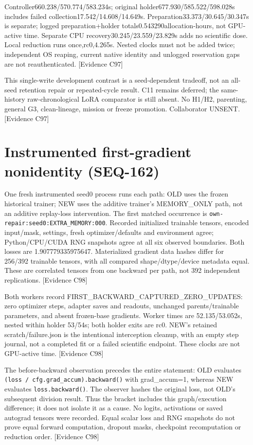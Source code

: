 \documentclass[11pt]{article}
\newcommand{\ev}[1]{\textsf{[Evidence #1]}}
\begin{document}
Controller660.238/570.774/583.234s; original holder677.930/585.522/598.028s includes
failed collection17.542/14.608/14.649s. Preparation33.373/30.645/30.347s is separate;
logged preparation+holder totals0.543290allocation-hours, not GPU-active time.
Separate CPU recovery30.245/23.559/23.829s adds no scientific dose. Local reduction
runs once,rc0,4.265s. Nested clocks must not be added twice; independent OS reaping,
current native identity and unlogged reservation gaps are not reauthenticated. \ev{C97}

This single-write development contrast is a seed-dependent tradeoff, not an
all-seed retention repair or repeated-cycle result. C11 remains deferred; the
same-history raw-chronological LoRA comparator is still absent. No H1/H2,
parenting, general G3, clean-lineage, mission or freeze promotion. Collaborator UNSENT. \ev{C97}

\section{Instrumented first-gradient nonidentity (SEQ-162)}
\label{sec:seq162-gradient}
One fresh instrumented seed0 process runs each path: OLD uses the frozen
historical trainer; NEW uses the additive trainer's MEMORY\_ONLY path, not an
additive replay-loss intervention. The first matched occurrence is
\texttt{own-repair:seed0:EXTRA\_MEMORY:000}. Recorded initialized trainable tensors,
encoded input/mask, settings, fresh optimizer/defaults and environment agree;
Python/CPU/CUDA RNG snapshots agree at all six observed boundaries. Both losses
are 1.907779335975647. Materialized gradient data hashes differ for 256/392 trainable
tensors, with all compared shape/dtype/device metadata equal. These are correlated
tensors from one backward per path, not 392 independent replications. \ev{C98}

Both workers record FIRST\_BACKWARD\_CAPTURED\_ZERO\_UPDATES: zero optimizer steps,
adapter saves and readouts, unchanged parents/trainable parameters, and absent
frozen-base gradients. Worker times are 52.135/53.052s, nested within holder
53/54s; both holder exits are rc0. NEW's retained scratch/failure.json is the
intentional interception cleanup, with an empty step journal, not a completed
fit or a failed scientific endpoint. These clocks are not GPU-active time. \ev{C98}

The before-backward observation precedes the entire statement: OLD evaluates
\texttt{(loss / cfg.grad\_accum).backward()} with grad\_accum=1, whereas NEW evaluates
\texttt{loss.backward()}. The observer hashes the original loss, not OLD's subsequent
division result. Thus the bracket includes this graph/execution difference;
it does not isolate it as a cause. No logits, activations or saved autograd
tensors were recorded. Equal scalar loss and RNG snapshots do not prove equal
forward computation, dropout masks, checkpoint recomputation or reduction order. \ev{C98}
\end{document}
